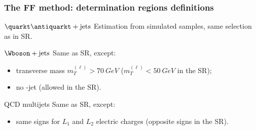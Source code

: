 %

\begin{frame}
\frametitle{The FF method: determination regions definitions}

\begin{block}{$\quarkt\antiquarkt+\text{jets}$}
Estimation from simulated samples, same selection as in SR.
\end{block}

\pause\vfill

\begin{block}{$\Wboson+\text{jets}$}
Same as SR, except:
\begin{itemize}
\item transverse mass $m_T^{(\ell)}>\SI{70}{GeV}$ ($m_T^{(\ell)}<\SI{50}{GeV}$ in the SR);
\item no \quarkb-jet (allowed in the SR).
\end{itemize}
\end{block}

\pause\vfill

\begin{block}{QCD multijets}
Same as SR, except:
\begin{itemize}
\item same signs for $L_1$ and $L_2$ electric charges (opposite signs in the SR).
\end{itemize}
\end{block}

\end{frame}

